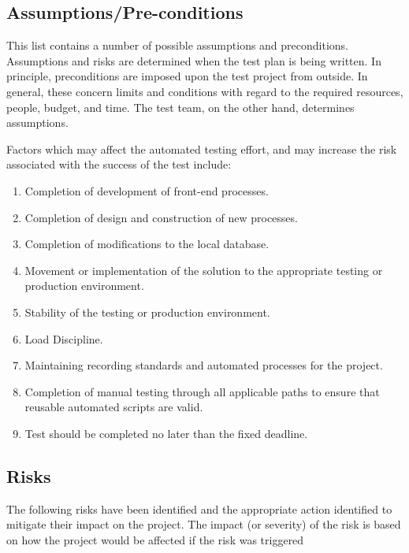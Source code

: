\documentclass{unitemplate}
\begin{document}
\subsection{Assumptions/Pre-conditions}
This list contains a number of possible assumptions and preconditions. Assumptions and risks are determined when the test plan is being written. In principle, preconditions are imposed upon the test project from outside. In general, these concern limits and conditions with regard to the required resources, people, budget, and time. The test team, on the other hand, determines assumptions.

Factors which may affect the automated testing effort, and may increase the risk associated with the success of the test include:

\begin{enumerate}
	\item Completion of development of front-end processes.
	\item Completion of design and construction of new processes.
	\item Completion of modifications to the local database.
	\item Movement or implementation of the solution to the appropriate testing or production environment.
	\item Stability of the testing or production environment.
	\item Load Discipline.
	\item Maintaining recording standards and automated processes for the project.
	\item Completion of manual testing through all applicable paths to ensure that reusable automated scripts are valid.
    \item Test should be completed no later than the fixed deadline.
\end{enumerate}

\subsection{Risks}
The following risks have been identified and the appropriate action identified to mitigate their impact on the project.  The impact (or severity) of the risk is based on how the project would be affected if the risk was triggered
\end{document}

